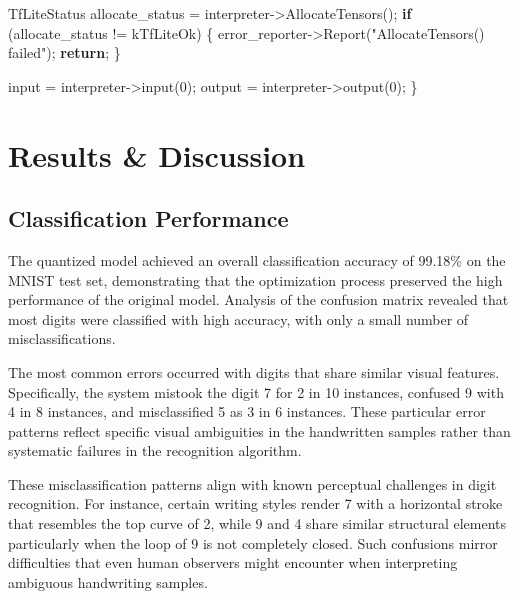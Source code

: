 \documentclass[
  9pt,
  letterpaper,
  abstract,
  titlepage]{scrbook}
\newenvironment{Shaded}{\begin{snugshade}}{\end{snugshade}}
\newcommand{\ControlFlowTok}[1]{\textcolor[rgb]{0.00,0.23,0.31}{\textbf{#1}}}
\newcommand{\DecValTok}[1]{\textcolor[rgb]{0.68,0.00,0.00}{#1}}
\newcommand{\NormalTok}[1]{\textcolor[rgb]{0.00,0.23,0.31}{#1}}
\newcommand{\OperatorTok}[1]{\textcolor[rgb]{0.37,0.37,0.37}{#1}}
\newcommand{\StringTok}[1]{\textcolor[rgb]{0.13,0.47,0.30}{#1}}
\begin{document}
\begin{Shaded}
\begin{Highlighting}[]
\NormalTok{    TfLiteStatus allocate\_status }\OperatorTok{=}\NormalTok{ interpreter}\OperatorTok{{-}\textgreater{}}\NormalTok{AllocateTensors}\OperatorTok{();}
    \ControlFlowTok{if} \OperatorTok{(}\NormalTok{allocate\_status }\OperatorTok{!=}\NormalTok{ kTfLiteOk}\OperatorTok{)} \OperatorTok{\{}
\NormalTok{        error\_reporter}\OperatorTok{{-}\textgreater{}}\NormalTok{Report}\OperatorTok{(}\StringTok{"AllocateTensors() failed"}\OperatorTok{);}
        \ControlFlowTok{return}\OperatorTok{;}
    \OperatorTok{\}}

\NormalTok{    input }\OperatorTok{=}\NormalTok{ interpreter}\OperatorTok{{-}\textgreater{}}\NormalTok{input}\OperatorTok{(}\DecValTok{0}\OperatorTok{);}
\NormalTok{    output }\OperatorTok{=}\NormalTok{ interpreter}\OperatorTok{{-}\textgreater{}}\NormalTok{output}\OperatorTok{(}\DecValTok{0}\OperatorTok{);}
\OperatorTok{\}}
\end{Highlighting}
\end{Shaded}

\section{Results \& Discussion}\label{results-discussion}

\subsection{Classification
Performance}\label{classification-performance}

The quantized model achieved an overall classification accuracy of
99.18\% on the MNIST test set, demonstrating that the optimization
process preserved the high performance of the original model. Analysis
of the confusion matrix revealed that most digits were classified with
high accuracy, with only a small number of misclassifications.

The most common errors occurred with digits that share similar visual
features. Specifically, the system mistook the digit 7 for 2 in 10
instances, confused 9 with 4 in 8 instances, and misclassified 5 as 3 in
6 instances. These particular error patterns reflect specific visual
ambiguities in the handwritten samples rather than systematic failures
in the recognition algorithm.

These misclassification patterns align with known perceptual challenges
in digit recognition. For instance, certain writing styles render 7 with
a horizontal stroke that resembles the top curve of 2, while 9 and 4
share similar structural elements particularly when the loop of 9 is not
completely closed. Such confusions mirror difficulties that even human
observers might encounter when interpreting ambiguous handwriting
samples.
\end{document}
